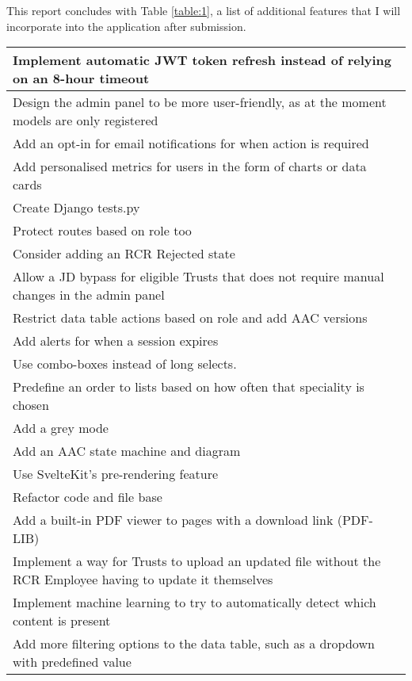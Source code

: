This report concludes with Table \ref{table:1}, a list of additional features that I will incorporate into the application after submission.

\def\arraystretch{1.22}
\begin{table}[h!]
\small
\vspace{-20pt}
\centering
\begin{tabular}{||m{}||}
   \hline
 Implement automatic JWT token refresh instead of relying on an 8-hour timeout\\ 
\hline
 Design the admin panel to be more user-friendly, as at the moment models are only registered\\
\hline
 Add an opt-in for email notifications for when action is required\\
\hline
 Add personalised metrics for users in the form of charts or data cards\\
\hline
 Create Django tests.py\\
\hline
 Protect routes based on role too\\
\hline
 Consider adding an RCR Rejected state\\
\hline
 Allow a JD bypass for eligible Trusts that does not require manual changes in the admin panel\\ 
\hline
 Restrict data table actions based on role and add AAC versions\\ 
\hline
 Add alerts for when a session expires\\ 
\hline
 Use combo-boxes instead of long selects.\\ 
\hline
  Predefine an order to lists based on how often that speciality is chosen\\ 
\hline
 Add a grey mode\\ 
\hline
 Add an AAC state machine and diagram\\ 
\hline
 Use SvelteKit's pre-rendering feature\\ 
\hline
 Refactor code and file base\\ 
\hline
  Add a built-in PDF viewer to pages with a download link (PDF-LIB)\\ 
\hline
  Implement a way for Trusts to upload an updated file without the RCR Employee having to update it themselves\\ 
\hline
 Implement machine learning to try to automatically detect which content is present\\ 
\hline
  Add more filtering options to the data table, such as a dropdown with predefined value\\ 

\end{tabular}
\end{table}
